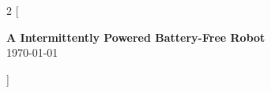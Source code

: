 \documentclass[a4paper, 9pt, oneside]{article}
\begin{document}
	\begin{multicols}{2}
		[
		\begin{center}
		{\Large{\textbf{A Intermittently Powered Battery-Free Robot}}} \\
		\vspace{0.5em}
		\today				
		\end{center}
		]
		
		
		
		
		
		
		
		
		
		
		

	\end{multicols}
\end{document}
